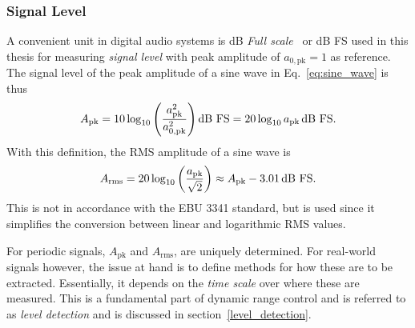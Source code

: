 \documentclass[../main2.tex]{subfiles}
\begin{document}
\subsubsection{Signal Level}
A convenient unit in digital audio systems is dB \emph{Full scale}~\cite{db_fullscale} or dB FS used in this thesis for measuring \emph{signal level} with peak amplitude of $a_{0, \text{pk}} = 1$ as reference. The signal level of the peak amplitude of a sine wave in Eq.~\eqref{eq:sine_wave} is thus
\begin{equation}
A_\text{pk} = 10 \log_{10} \left( \frac{a_\text{pk}^2}{a_{0, \text{pk}}^2} \right) \text{dB FS} = 20 \log_{10} a_\text{pk} \mskip3mu\text{dB FS}.
\end{equation}
With this definition, the RMS amplitude of a sine wave is
\begin{equation}
A_\text{rms} = 20\log_{10} \left( \frac{a_\text{pk}}{\sqrt 2} \right) \approx A_\text{pk} - 3.01 \mskip3mu\text{dB FS}.
\end{equation}
This is not in accordance with the EBU 3341 standard, but is used  since it simplifies the conversion between linear and logarithmic RMS values.

For periodic signals, $A_\text{pk}$ and $A_\text{rms}$, are uniquely determined. For real-world signals however, the issue at hand is to define methods for how these are to be extracted. Essentially, it depends on the \emph{time scale} over where these are measured. This is a fundamental part of dynamic range control and is referred to as \emph{level detection} and is discussed in section~\ref{level_detection}.
\end{document}
